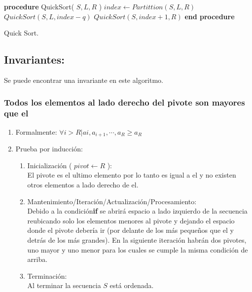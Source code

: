 \documentclass[12pt,spanish]{article}
\theoremstyle{definition}
\begin{document}
\begin{algorithm}
\begin{algorithmic}[1]
\STATE \textbf{procedure} QuickSort( $S, L, R$ ) 
        \STATE $index \leftarrow Partittion(S,L,R)$
        \STATE $QuickSort( S, L, index -q ) $ 
        \STATE $QuickSort( S, index+1, R ) $
    \ENDIF
\STATE \textbf{end procedure}
\caption{Quick Sort.}
\end{algorithmic}
\end{algorithm}

\subsection{Invariantes:}{}
Se puede encontrar una invariante en este algoritmo.
\subsubsection{Todos los elementos al lado derecho del pivote son mayores que el}{}

\begin{enumerate}
\item Formalmente: $\forall i > R | a{i}, a_{i+1}, \cdots, a_{R} \geq a_{R}$

\item Prueba por inducción:
    \begin{enumerate}
    \item Inicialización ( $pivot \leftarrow R $ ):\\
        El pivote es el ultimo elemento por lo tanto es igual a el y no existen otros elementos a lado derecho de el.
    \item Mantenimiento/Iteración/Actualización/Procesamiento:\\
        Debido a la condición\textbf{if} se abrirá espacio a lado izquierdo de la secuencia reubicando solo los elementos menores al pivote y dejando el espacio donde el pivote debería ir (por delante de los más pequeños que el y detrás de los más grandes).
        En la siguiente iteración habrán dos pivotes, uno mayor y uno menor para los cuales se cumple la misma condición de arriba.
    \item Terminación: \\
        Al terminar la secuencia $S$ está ordenada.
    \end{enumerate}
\end{enumerate}

\end{document}
